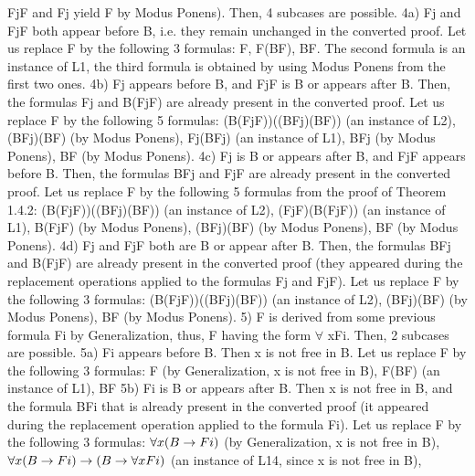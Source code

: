 Fj\IMPLIES F and Fj yield F by Modus Ponens). Then, 4 subcases are possible.
4a) Fj and Fj\IMPLIES F both appear before B, i.e. they remain unchanged in the converted proof. Let us replace
F by the following 3 formulas: F, F\IMPLIES (B\IMPLIES F), B\IMPLIES F. The second formula is an instance of L1, the third
formula is obtained by using Modus Ponens from the first two ones.
4b) Fj appears before B, and Fj\IMPLIES F is B or appears after B. Then, the formulas Fj and B\IMPLIES (Fj\IMPLIES F) are
already present in the converted proof. Let us replace F by the following 5 formulas:
(B\IMPLIES (Fj\IMPLIES F))\IMPLIES ((B\IMPLIES Fj)\IMPLIES (B\IMPLIES F)) (an instance of L2),
(B\IMPLIES Fj)\IMPLIES (B\IMPLIES F) (by Modus Ponens),
Fj\IMPLIES (B\IMPLIES Fj) (an instance of L1),
B\IMPLIES Fj (by Modus Ponens),
B\IMPLIES F (by Modus Ponens).
4c) Fj is B or appears after B, and Fj\IMPLIES F appears before B. Then, the formulas B\IMPLIES Fj and Fj\IMPLIES F are
already present in the converted proof. Let us replace F by the following 5 formulas from the proof of
Theorem 1.4.2:
(B\IMPLIES (Fj\IMPLIES F))\IMPLIES ((B\IMPLIES Fj)\IMPLIES (B\IMPLIES F)) (an instance of L2),
(Fj\IMPLIES F)\IMPLIES (B\IMPLIES (Fj\IMPLIES F)) (an instance of L1),
B\IMPLIES (Fj\IMPLIES F) (by Modus Ponens),
(B\IMPLIES Fj)\IMPLIES (B\IMPLIES F) (by Modus Ponens),
B\IMPLIES F (by Modus Ponens).
4d) Fj and Fj\IMPLIES F both are B or appear after B. Then, the formulas B\IMPLIES Fj and B\IMPLIES (Fj\IMPLIES F) are already
present in the converted proof (they appeared during the replacement operations applied to the formulas
Fj and Fj\IMPLIES F). Let us replace F by the following 3 formulas:
(B\IMPLIES (Fj\IMPLIES F))\IMPLIES ((B\IMPLIES Fj)\IMPLIES (B\IMPLIES F)) (an instance of L2),
(B\IMPLIES Fj)\IMPLIES (B\IMPLIES F) (by Modus Ponens),
B\IMPLIES F (by Modus Ponens).
5) F is derived from some previous formula Fi by Generalization, thus, F having the form \(\forall\) xFi. Then, 2
subcases are possible.
5a) Fi appears before B. Then x is not free in B. Let us replace F by the following 3 formulas:
F (by Generalization, x is not free in B),
F\IMPLIES (B\IMPLIES F) (an instance of L1),
B\IMPLIES F
5b) Fi is B or appears after B. Then x is not free in B, and the formula B\IMPLIES Fi that is already present in the
converted proof (it appeared during the replacement operation applied to the formula Fi). Let us replace F
by the following 3 formulas:
\(\forall x(B\rightarrow Fi)\) (by Generalization, x is not free in B),
\(\forall x(B\rightarrow Fi)\rightarrow (B\rightarrow \forall xFi)\) (an instance of L14, since x is not free in B),
